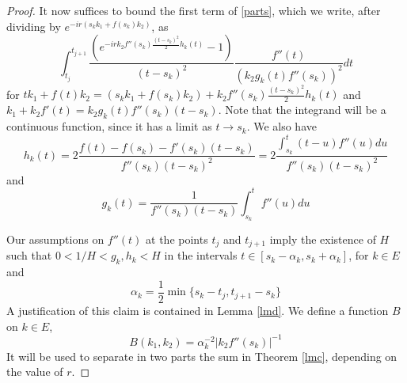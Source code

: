 \documentclass[12pt]{amsart}
\numberwithin{equation}{subsection}
\theoremstyle{definition}
\theoremstyle{plain}
\begin{document}
\begin{proof}
It now suffices to bound the first term of \eqref{parts}, which we write, after dividing by $e^{-ir(s_k k_1 + f(s_k) k_2)}$, as
\[
\int_{t_j}^{t_{j+1}}
\frac{(e^{-ir k_2 f''(s_k) \frac{(t-s_k)^2}{2} h_{k}(t)}-1)}{(t-s_k)^2}\frac{f''(t)}{(k_2 g_{k}(t)
f''(s_k))^2}dt
\]
for $tk_1 + f(t) k_2 = (s_k k_1 + f(s_k) k_2) + k_2 f''(s_k) \frac{(t-s_k)^2}{2} h_{k}(t)$ and $k_1 + k_2 f'(t) = k_2 g_{k}(t)
f''(s_k) (t-s_k)$.
Note that the integrand will be a continuous function, since it has a limit as $t \rightarrow s_k$.
We also have
\[
h_k(t)=2\frac{f(t)-f(s_k)-f'(s_k)(t-s_k)}{f''(s_k)(t-s_k)^2}
 = 2\frac{\int_{s_k}^t (t-u)f''(u)du}{f''(s_k)(t-s_k)^2}
\]
and
\[
g_{k}(t) = \frac{1}{f''(s_k)(t-s_k)}\int_{s_k}^t f''(u)du
\]

Our assumptions on $f''(t)$ at the points $t_j$ and $t_{j+1}$ imply the existence of
$H$ such that $0 < 1/H < g_k,h_k < H$
in the intervals $t \in [s_k-\alpha_k,s_k +\alpha_k]$,
for $k \in E$ and
\begin{equation}
\label{formulak}
\alpha_k = \frac{1}{2}\min \{ s_k - t_j, t_{j+1}-s_k \}
\end{equation}
A justification of this claim is contained in Lemma \ref{lmd}.
We define a function $B$ on $k \in E$,
\begin{equation}
B(k_1,k_2) = \alpha_k^{-2} |k_2 f''(s_k)|^{-1}
\end{equation}
It will be used to separate in two parts the sum in Theorem \ref{lmc},
depending on the value of $r$.


\end{proof}
\end{document}
